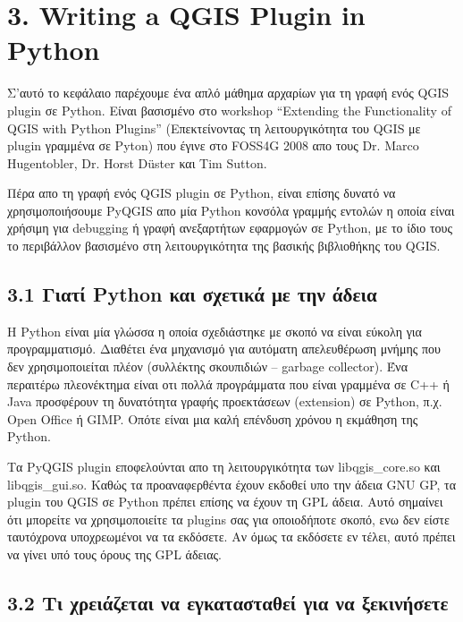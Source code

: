 
\section{3. Writing a QGIS Plugin in Python}


Σ'αυτό το κεφάλαιο παρέχουμε ένα απλό μάθημα αρχαρίων για τη γραφή ενός QGIS plugin σε Python. Είναι βασισμένο στο workshop “Extending the Functionality of QGIS with Python Plugins” (Επεκτείνοντας τη λειτουργικότητα του QGIS με plugin γραμμένα σε Pyton) που έγινε στο FOSS4G 2008 απο τους  Dr. Marco Hugentobler, Dr. Horst
D\"uster και Tim Sutton. 

Πέρα απο τη γραφή ενός QGIS plugin σε Python, είναι επίσης δυνατό να χρησιμοποιήσουμε PyQGIS απο μία Python κονσόλα γραμμής εντολών η οποία είναι χρήσιμη για debugging ή γραφή ανεξαρτήτων  εφαρμογών σε Python, με το ίδιο τους το περιβάλλον βασισμένο στη λειτουργικότητα της βασικής βιβλιοθήκης του QGIS.

\subsection{3.1 Γιατί Python και σχετικά με την άδεια}

Η Python είναι μία γλώσσα η οποία σχεδιάστηκε με σκοπό να είναι εύκολη για προγραμματισμό. Διαθέτει ένα μηχανισμό για αυτόματη απελευθέρωση μνήμης που δεν χρησιμοποιείται πλέον (συλλέκτης σκουπιδιών – garbage collector). Ένα περαιτέρω πλεονέκτημα είναι οτι πολλά προγράμματα που είναι γραμμένα σε C++ ή Java προσφέρουν τη δυνατότητα γραφής προεκτάσεων (extension) σε Python, π.χ. Open Office ή GIMP. Οπότε είναι μια καλή επένδυση χρόνου η εκμάθηση της Python.

Τα PyQGIS plugin εποφελούνται απο τη λειτουργικότητα των libqgis\_core.so και libqgis\_gui.so. Καθώς τα προαναφερθέντα έχουν εκδοθεί υπο την άδεια GNU GP, τα plugin του QGIS σε Python πρέπει επίσης να έχουν τη GPL άδεια. Αυτό σημαίνει ότι μπορείτε να χρησιμοποιείτε τα plugins σας για οποιοδήποτε σκοπό, ενω δεν είστε ταυτόχρονα υποχρεωμένοι να τα εκδόσετε. Αν όμως τα εκδόσετε εν τέλει, αυτό πρέπει να γίνει υπό τους όρους της GPL άδειας. 

\subsection{3.2 Τι χρειάζεται να εγκατασταθεί για να ξεκινήσετε}

